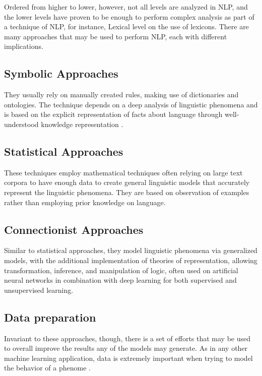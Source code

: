 Ordered from higher to lower, however, not all levels are analyzed in NLP, and the lower levels have proven to be enough to perform complex analysis as part of a technique of NLP, for instance, Lexical level on the use of lexicons. There are many approaches that may be used to perform NLP, each with different implications.

\subsection{Symbolic Approaches}

They usually rely on manually created rules, making use of dictionaries and ontologies. The technique depends on a deep analysis of linguistic phenomena and is based on the explicit representation of facts about language through well-understood knowledge representation \cite{nadkarni2011}.

\subsection{Statistical Approaches}

These techniques employ mathematical techniques often relying on large text corpora to have enough data to create general linguistic models that accurately represent the linguistic phenomena. They are based on observation of examples rather than employing prior knowledge on language.

\subsection{Connectionist Approaches}

Similar to statistical approaches, they model linguistic phenomena via generalized models, with the additional implementation of theories of representation, allowing transformation, inference, and manipulation of logic, often used on artificial neural networks in combination with deep learning for both supervised and unsupervised learning.

\subsection{Data preparation}

Invariant to these approaches, though, there is a set of efforts that may be used to overall improve the results any of the models may generate. As in any other machine learning application, data is extremely important when trying to model the behavior of a phenome \cite{hickman2020}. 

